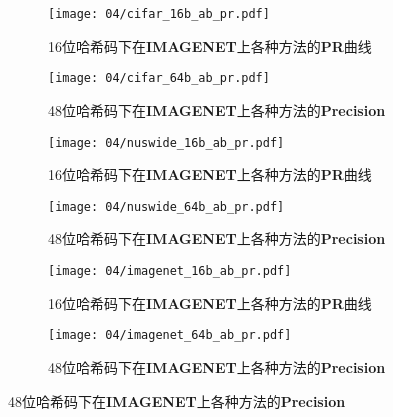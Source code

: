 \begin{figure}[!htp]
  \begin{subfigure}{0.45\textwidth}
    \centering
    \texttt{[image: 04/cifar\_16b\_ab\_pr.pdf]}
    \caption{16位哈希码下在\textbf{IMAGENET}上各种方法的\textbf{PR}曲线}
  \end{subfigure}
  \hspace{1cm}
  \begin{subfigure}{0.45\textwidth}
    \centering
    \texttt{[image: 04/cifar\_64b\_ab\_pr.pdf]}
    \caption{48位哈希码下在\textbf{IMAGENET}上各种方法的\textbf{Precision}}
  \end{subfigure}
  \hspace{1cm}
  \begin{subfigure}{0.45\textwidth}
    \centering
    \texttt{[image: 04/nuswide\_16b\_ab\_pr.pdf]}
    \caption{16位哈希码下在\textbf{IMAGENET}上各种方法的\textbf{PR}曲线}
  \end{subfigure}
  \hspace{1cm}
  \begin{subfigure}{0.45\textwidth}
    \centering
    \texttt{[image: 04/nuswide\_64b\_ab\_pr.pdf]}
    \caption{48位哈希码下在\textbf{IMAGENET}上各种方法的\textbf{Precision}}
  \end{subfigure}
  \hspace{1cm}
  \begin{subfigure}{0.45\textwidth}
    \centering
    \texttt{[image: 04/imagenet\_16b\_ab\_pr.pdf]}
    \caption{16位哈希码下在\textbf{IMAGENET}上各种方法的\textbf{PR}曲线}
  \end{subfigure}
  \hspace{1cm}
  \begin{subfigure}{0.45\textwidth}
    \centering
    \texttt{[image: 04/imagenet\_64b\_ab\_pr.pdf]}
    \caption{48位哈希码下在\textbf{IMAGENET}上各种方法的\textbf{Precision}}
  \end{subfigure}
  \label{fig:ablationresults}
\end{figure}


